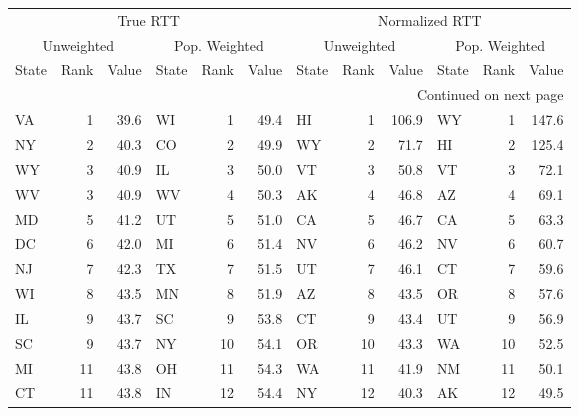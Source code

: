 \begin{longtable}{lrr|lrr||lrr|lrr}
\toprule
  \multicolumn{6}{c||}{True RTT} & \multicolumn{6}{c}{Normalized RTT} \\
\multicolumn{3}{c|}{Unweighted} & \multicolumn{3}{c||}{Pop. Weighted} & \multicolumn{3}{c|}{Unweighted} & \multicolumn{3}{c}{Pop. Weighted} \\
     State & Rank & Value &         State & Rank &  Value &          State & Rank &  Value &         State & Rank &  Value \\
\midrule
\endhead
\midrule
\multicolumn{12}{r}{{Continued on next page}} \\
\midrule
\endfoot
\bottomrule
\endlastfoot
        VA &    1 &  39.6 &            WI &    1 &   49.4 &             HI &    1 &  106.9 &            WY &    1 &  147.6 \\
        NY &    2 &  40.3 &            CO &    2 &   49.9 &             WY &    2 &   71.7 &            HI &    2 &  125.4 \\
        WY &    3 &  40.9 &            IL &    3 &   50.0 &             VT &    3 &   50.8 &            VT &    3 &   72.1 \\
        WV &    3 &  40.9 &            WV &    4 &   50.3 &             AK &    4 &   46.8 &            AZ &    4 &   69.1 \\
        MD &    5 &  41.2 &            UT &    5 &   51.0 &             CA &    5 &   46.7 &            CA &    5 &   63.3 \\
        DC &    6 &  42.0 &            MI &    6 &   51.4 &             NV &    6 &   46.2 &            NV &    6 &   60.7 \\
        NJ &    7 &  42.3 &            TX &    7 &   51.5 &             UT &    7 &   46.1 &            CT &    7 &   59.6 \\
        WI &    8 &  43.5 &            MN &    8 &   51.9 &             AZ &    8 &   43.5 &            OR &    8 &   57.6 \\
        IL &    9 &  43.7 &            SC &    9 &   53.8 &             CT &    9 &   43.4 &            UT &    9 &   56.9 \\
        SC &    9 &  43.7 &            NY &   10 &   54.1 &             OR &   10 &   43.3 &            WA &   10 &   52.5 \\
        MI &   11 &  43.8 &            OH &   11 &   54.3 &             WA &   11 &   41.9 &            NM &   11 &   50.1 \\
        CT &   11 &  43.8 &            IN &   12 &   54.4 &             NY &   12 &   40.3 &            AK &   12 &   49.5 \\

\end{longtable}
